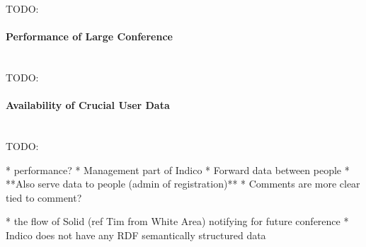 TODO:
\vspace{0.5cm}
\paragraph{Performance of Large Conference}\mbox{}\\

TODO:
\vspace{0.5cm}
\paragraph{Availability of Crucial User Data}\mbox{}\\

TODO:


* performance?
* Management part of Indico
  * Forward data between people
  * **Also serve data to people (admin of registration)**
* Comments are more clear tied to comment?

* the flow of Solid (ref Tim from White Area) notifying for future conference
* Indico does not have any RDF semantically structured data